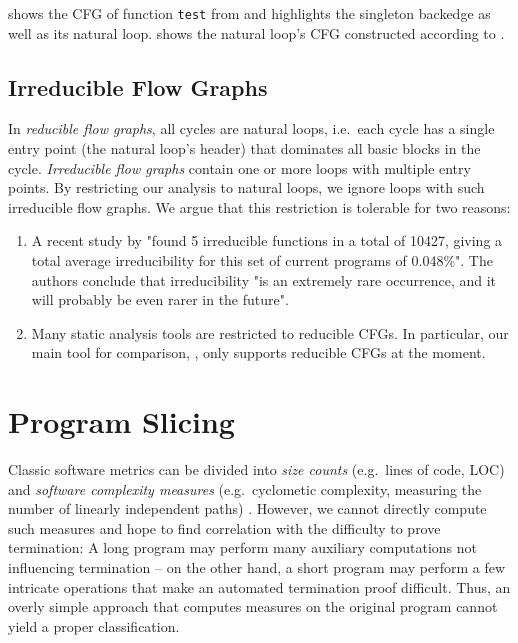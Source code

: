 \begin{example}
 shows the CFG of function \texttt{test} from  and highlights the singleton backedge as well as its natural loop.  shows the natural loop's CFG constructed according to .
\end{example}

\subsection{Irreducible Flow Graphs}
In \emph{reducible flow graphs}, all cycles are natural loops, i.e.\ each cycle has a single entry point (the natural loop's header) that dominates all basic blocks in the cycle. \emph{Irreducible flow graphs} contain one or more loops with multiple entry points. By restricting our analysis to natural loops, we ignore loops with such irreducible flow graphs. We argue that this restriction is tolerable for two reasons:

\begin{enumerate}
    \item A recent study by \citeauthor{DBLP:journals/spe/StanierW12} \cite{DBLP:journals/spe/StanierW12} "found 5 irreducible functions in a total of \num{10427}, giving a total average irreducibility for this set of current programs of 0.048\%". The authors conclude that irreducibility "is an extremely rare occurrence, and it will probably be even rarer in the future".
    \item Many static analysis tools are restricted to reducible CFGs. In particular, our main tool for comparison, \loopus, only supports reducible CFGs at the moment.
\end{enumerate}

\section{Program Slicing}
\label{sec:slicing}

Classic software metrics can be divided into \emph{size counts} (e.g.\ lines of code, LOC) and \emph{software complexity measures} (e.g.\ cyclometic complexity, measuring the number of linearly independent paths) \cite{DBLP:journals/jss/FentonN99}. However, we cannot directly compute such measures and hope to find correlation with the difficulty to prove termination: A long program may perform many auxiliary computations not influencing termination -- on the other hand, a short program may perform a few intricate operations that make an automated termination proof difficult. Thus, an overly simple approach that computes measures on the original program cannot yield a proper classification.

